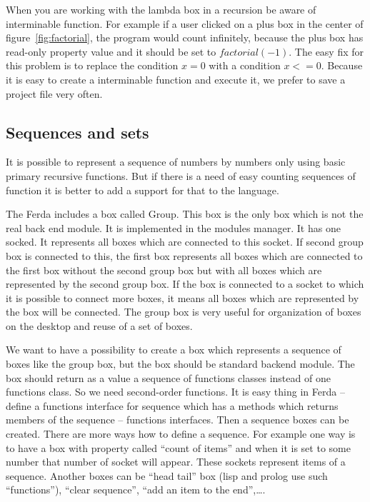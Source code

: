 \documentclass[a4paper,12pt]{book}
\begin{document}
When you are working with the lambda box in a recursion be aware of interminable function. For example if a user clicked on a plus box in the center of figure~\ref{fig:factorial}, the program would count infinitely, because the plus box has read-only property value and it should be set to $factorial(-1)$. The easy fix for this problem is to replace the condition $x=0$ with a condition $x<=0$. Because it is easy to create a interminable function and execute it, we prefer to save a project file very often.

\subsection{Sequences and sets}
\label{sec:sequences}
It is possible to represent a sequence of numbers by numbers only using basic primary recursive functions. But if there is a need of easy counting sequences of function it is better to add a support for that to the language.

The Ferda includes a box called Group. This box is the only box which is not the real back end module. It is implemented in the modules manager. It has one socked. It represents all boxes which are connected to this socket. If second group box is connected to this, the first box represents all boxes which are connected to the first box without the second group box but with all boxes which are represented by the second group box. If the box is connected to a socket to which it is possible to connect more boxes, it means all boxes which are represented by the box will be connected. The group box is very useful for organization of boxes on the desktop and reuse of a set of boxes.

We want to have a possibility to create a box which represents a sequence of boxes like the group box, but the box should be standard backend module. The box should return as a value a sequence of functions classes instead of one functions class. So we need second-order functions. It is easy thing in Ferda -- define a functions interface for sequence which has a methods which returns members of the sequence -- functions interfaces. Then a sequence boxes can be created. There are more ways how to define a sequence. For example one way is to have a box with property called ``count of items'' and when it is set to some number that number of socket will appear. These sockets represent items of a sequence. Another boxes can be ``head tail'' box (lisp and prolog use such ``functions''), ``clear sequence'',  ``add an item to the end'',\dots.
\end{document}
